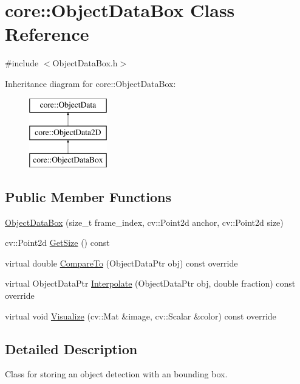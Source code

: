 \hypertarget{classcore_1_1ObjectDataBox}{}\section{core\+:\+:Object\+Data\+Box Class Reference}
\label{classcore_1_1ObjectDataBox}


{\ttfamily \#include $<$Object\+Data\+Box.\+h$>$}

Inheritance diagram for core\+:\+:Object\+Data\+Box\+:\begin{figure}[H]
\begin{center}
\leavevmode
\includegraphics[height=3.000000cm]{classcore_1_1ObjectDataBox}
\end{center}
\end{figure}
\subsection*{Public Member Functions}
\begin{DoxyCompactItemize}
\item 
\hyperlink{classcore_1_1ObjectDataBox_a9a1ee3e1e603c1e55adc58a1a58efad2}{Object\+Data\+Box} (size\+\_\+t frame\+\_\+index, cv\+::\+Point2d anchor, cv\+::\+Point2d size)
\item 
cv\+::\+Point2d \hyperlink{classcore_1_1ObjectDataBox_a76e9f48dfb685d16de868a129c1f3918}{Get\+Size} () const
\item 
virtual double \hyperlink{classcore_1_1ObjectDataBox_a163c57338778f957ce514611c509558a}{Compare\+To} (Object\+Data\+Ptr obj) const override
\item 
virtual Object\+Data\+Ptr \hyperlink{classcore_1_1ObjectDataBox_ab2816bceb771dd7442e6c29193dfe267}{Interpolate} (Object\+Data\+Ptr obj, double fraction) const override
\item 
virtual void \hyperlink{classcore_1_1ObjectDataBox_ab29bacb20c258ba572d0372469ec5523}{Visualize} (cv\+::\+Mat \&image, cv\+::\+Scalar \&color) const override
\end{DoxyCompactItemize}


\subsection{Detailed Description}
Class for storing an object detection with an bounding box. 

